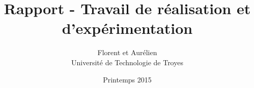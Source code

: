 \documentclass[11pt]{report}
\title{Rapport - Travail de réalisation et d'expérimentation}
\author{Florent \bsc{Pergoud} et Aurélien \bsc{Labate} \\ Université de Technologie de Troyes}
\date{Printemps 2015}
\begin{document}
    \maketitle
    
    \tableofcontents

    
    
    

    \appendix
    

    \nocite{*}
    
    
\end{document}
